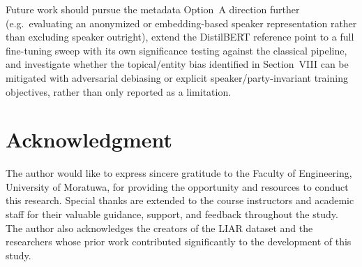 \documentclass[conference]{IEEEtran}
\begin{document}
Future work should pursue the metadata Option~A direction further (e.g.\
evaluating an anonymized or embedding-based speaker representation rather than
excluding speaker outright), extend the DistilBERT reference point to a full
fine-tuning sweep with its own significance testing against the classical
pipeline, and investigate whether the topical/entity bias identified in
Section~VIII can be mitigated with adversarial debiasing or explicit
speaker/party-invariant training objectives, rather than only reported as a
limitation.

\section*{Acknowledgment}
The author would like to express sincere gratitude to the Faculty of Engineering,
University of Moratuwa, for providing the opportunity and resources to conduct
this research. Special thanks are extended to the course instructors and academic
staff for their valuable guidance, support, and feedback throughout the study. The
author also acknowledges the creators of the LIAR dataset and the researchers
whose prior work contributed significantly to the development of this study.
\end{document}
